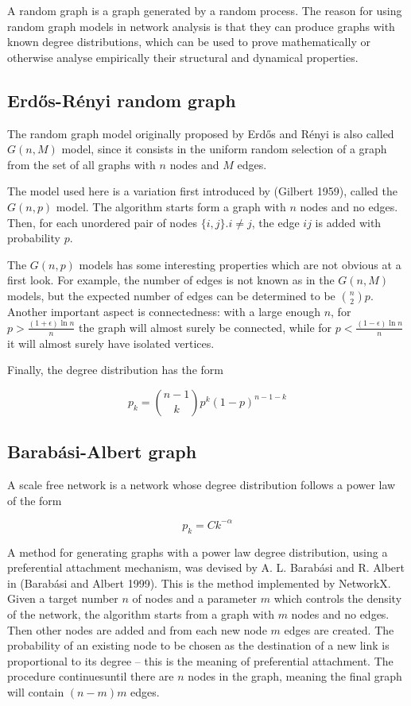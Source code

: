 \documentclass[a4paper,11pt,twoside,openleft]{memoir}
\begin{document}
A random graph is a graph generated by a random process. The reason for
using random graph models in network analysis is that they can produce
graphs with known degree distributions, which can be used to prove
mathematically or otherwise analyse empirically their structural and
dynamical properties.

\subsection{Erd\H{o}s-Rényi random
graph}\label{erdos-renyi-random-graph}

The random graph model originally proposed by Erd\H{o}s and Rényi is
also called $G(n,M)$ model, since it consists in the uniform random
selection of a graph from the set of all graphs with $n$ nodes and $M$
edges.

The model used here is a variation first introduced by (Gilbert 1959),
called the $G(n,p)$ model. The algorithm starts form a graph with $n$
nodes and no edges. Then, for each unordered pair of nodes
$\{i,j\} . i \neq j$, the edge $ij$ is added with probability $p$.

The $G(n,p)$ models has some interesting properties which are not
obvious at a first look. For example, the number of edges is not known
as in the $G(n,M)$ models, but the expected number of edges can be
determined to be $\binom{n}{2}p$. Another important aspect is
connectedness: with a large enough $n$,
for $p > \frac{(1+\epsilon) \ln n}{n}$ the graph will
almost surely be connected, while for $p < \frac{(1-\epsilon) \ln n}{n}$
it will almost surely have isolated vertices.

Finally, the degree distribution has the form

\begin{equation}
p_k = \binom{n-1}{k} p^k (1-p)^{n-1-k}
\end{equation}

\subsection{Barabási-Albert graph}\label{barabuxe1si-albert-graph}

A scale free network is a network whose degree distribution follows a
power law of the form

\begin{equation}
p_k = Ck^{-\alpha}
\end{equation}

A method for generating graphs with a power law degree distribution,
using a preferential attachment mechanism, was devised by A. L. Barabási
and R. Albert in (Barabási and Albert 1999). This is the method
implemented by NetworkX. Given a target number $n$ of nodes and a
parameter $m$ which controls the density of the network, the algorithm
starts from a graph with $m$ nodes and no edges. Then other nodes are
added and from each new node $m$ edges are created. The probability of an
existing node to be chosen as the destination of a new link is proportional
to its degree -- this is the meaning of preferential attachment.
The procedure continuesuntil there are $n$ nodes in the graph,
meaning the final graph will contain $(n-m) m$ edges.
\end{document}
